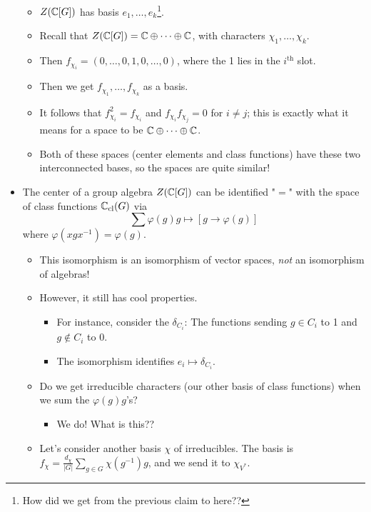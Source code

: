 \documentclass[../notes.tex]{subfiles}
\begin{document}
\begin{itemize}
\begin{itemize}
        \item $Z(\mathbb{C}[G])$ has basis $e_1,\dots,e_k$\footnote{How did we get from the previous claim to here??}.
        \item Recall that $Z(\mathbb{C}[G])=\mathbb{C}\oplus\cdots\oplus\mathbb{C}$, with characters $\chi_1,\dots,\chi_k$.
        \item Then $f_{\chi_i}=(0,\dots,0,1,0,\dots,0)$, where the 1 lies in the $i^\text{th}$ slot.
        \item Then we get $f_{\chi_1},\dots,f_{\chi_k}$ as a basis.
        \item It follows that $f_{\chi_i}^2=f_{\chi_i}$ and $f_{\chi_i}f_{\chi_j}=0$ for $i\neq j$; this is exactly what it means for a space to be $\mathbb{C}\oplus\cdots\oplus\mathbb{C}$.
        \item Both of these spaces (center elements and class functions) have these two interconnected bases, so the spaces are quite similar!
    \end{itemize}
    \item The center of a group algebra $Z(\mathbb{C}[G])$ can be identified "$=$" with the space of class functions $\mathbb{C}_\text{cl}(G)$ via
    \begin{equation*}
        \sum\varphi(g)g \mapsto [g\to\varphi(g)]
    \end{equation*}
    where $\varphi(xgx^{-1})=\varphi(g)$.
    \begin{itemize}
        \item This isomorphism is an isomorphism of vector spaces, \emph{not} an isomorphism of algebras!
        \item However, it still has cool properties.
        \begin{itemize}
            \item For instance, consider the $\delta_{C_i}$: The functions sending $g\in C_i$ to 1 and $g\notin C_i$ to 0.
            \item The isomorphism identifies $e_i\mapsto\delta_{C_i}$.
        \end{itemize}
        \item Do we get irreducible characters (our other basis of class functions) when we sum the $\varphi(g)g$'s?
        \begin{itemize}
            \item We do! What is this??
        \end{itemize}
        \item Let's consider another basis $\chi$ of irreducibles. The basis is $f_\chi=\frac{d_\chi}{|G|}\sum_{g\in G}\chi(g^{-1})g$, and we send it to $\chi_{V^*}$.

\end{itemize}
\end{itemize}
\end{document}
